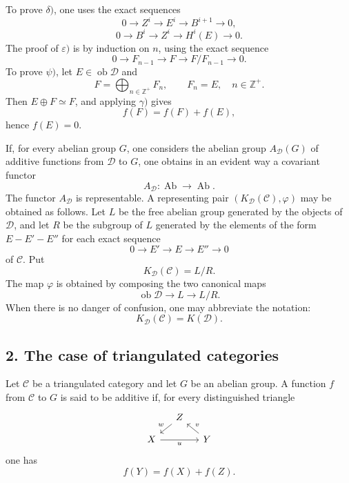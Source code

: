 \documentclass[11pt]{article}
\providecommand{\Ob}{\operatorname{ob}}
\providecommand{\cC}{\mathcal C}
\providecommand{\Ob}{\operatorname{ob}}
\providecommand{\Ab}{\operatorname{Ab}}
\providecommand{\cC}{\mathcal C}
\providecommand{\cD}{\mathcal D}
\providecommand{\Ab}{\operatorname{Ab}}
\providecommand{\Ob}{\operatorname{Ob}}
\begin{document}
To prove $\delta)$, one uses the exact sequences
\[
0\longrightarrow Z^i\longrightarrow E^i\longrightarrow B^{i+1}\longrightarrow 0,
\]
\[
0\longrightarrow B^i\longrightarrow Z^i\longrightarrow H^i(E)\longrightarrow 0.
\]
The proof of $\varepsilon)$ is by induction on $n$, using the exact sequence
\[
0\longrightarrow F_{n-1}\longrightarrow F\longrightarrow F/F_{n-1}\longrightarrow 0.
\]
To prove $\psi)$, let $E\in\Ob\cD$ and
\[
F=\bigoplus_{n\in\mathbb Z^+}F_n,\qquad F_n=E,\quad n\in\mathbb Z^+.
\]
Then $E\oplus F\simeq F$, and applying $\gamma)$ gives
\[
f(F)=f(F)+f(E),
\]
hence $f(E)=0$.

If, for every abelian group $G$, one considers the abelian group $A_{\cD}(G)$ of additive functions from $\cD$ to $G$, one obtains in an evident way a covariant functor
\[
A_{\cD}:\Ab\longrightarrow\Ab.
\]
The functor $A_{\cD}$ is representable. A representing pair $(K_{\cD}(\cC),\varphi)$ may be obtained as follows. Let $L$ be the free abelian group generated by the objects of $\cD$, and let $R$ be the subgroup of $L$ generated by the elements of the form $E-E'-E''$ for each exact sequence
\[
0\longrightarrow E'\longrightarrow E\longrightarrow E''\longrightarrow 0
\]
of $\cC$. Put
\[
K_{\cD}(\cC)=L/R.
\]
The map $\varphi$ is obtained by composing the two canonical maps
\[
\Ob\cD\longrightarrow L\longrightarrow L/R.
\]
When there is no danger of confusion, one may abbreviate the notation:
\[
K_{\cD}(\cC)=K(\cD).
\]

\subsection*{2. The case of triangulated categories}

Let $\cC$ be a triangulated category and let $G$ be an abelian group. A function $f$ from $\cC$ to $G$ is said to be additive if, for every distinguished triangle
\[
\begin{tikzcd}[column sep=small,row sep=small]
& Z \arrow[dl,"w"']\\
X \arrow[rr,"u"'] && Y \arrow[ul,"v"']
\end{tikzcd}
\]
one has
\[
f(Y)=f(X)+f(Z).
\]
\end{document}
